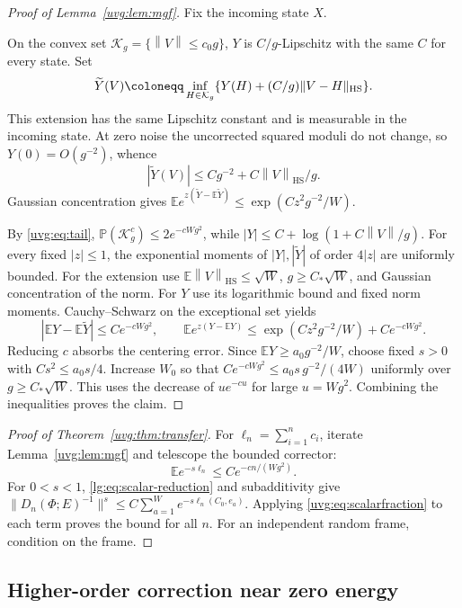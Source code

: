 \documentclass[11pt]{article}
\numberwithin{equation}{section}
\theoremstyle{remark}
\newcommand{\E}{\mathbb E}
\newcommand{\Prob}{\mathbb P}
\newcommand{\HS}{\mathrm{HS}}
\newcommand{\norm}[1]{\left\|#1\right\|}
\begin{document}
\begin{proof}[Proof of Lemma~\ref{uvg:lem:mgf}]
Fix the incoming state $X$.

On the convex set \(\mathcal K_g=\{\norm V\le c_0g\}\),
\(Y\) is \(C/g\)-Lipschitz with the same \(C\) for every state. Set
\[
 \widetilde Y(V)\coloneqq
 \inf_{H\in\mathcal K_g}\{Y(H)+(C/g)\|V-H\|_{\rm HS}\}.
\]
This extension has the same Lipschitz constant and is measurable in
the incoming state.
At zero noise the uncorrected squared moduli do not change,
so \(Y(0)=O(g^{-2})\), whence
\[
 |\widetilde Y(V)|\le Cg^{-2}+C\norm V_{\HS}/g.
\]
Gaussian concentration gives
\(\E e^{z(\widetilde Y-\E\widetilde Y)}
\le\exp(Cz^2g^{-2}/W)\).

By \eqref{uvg:eq:tail},
\(\Prob(\mathcal K_g^c)\le2e^{-cWg^2}\), while
\(|Y|\le C+\log(1+C\norm V/g)\).
For every fixed \(|z|\le1\), the exponential moments of
\(|Y|,|\widetilde Y|\) of order \(4|z|\) are uniformly bounded.
For the extension use \(\E\norm V_{\HS}\le\sqrt W\),
\(g\ge C_*\sqrt W\), and Gaussian concentration of the norm.
For \(Y\) use its logarithmic bound and fixed norm moments.
Cauchy--Schwarz on the exceptional set yields
\[
 |\E Y-\E\widetilde Y|\le Ce^{-cWg^2},\qquad
 \E e^{z(Y-\E Y)}
 \le\exp(Cz^2g^{-2}/W)+Ce^{-cWg^2}.
\]
Reducing \(c\) absorbs the centering error. Since
\(\E Y\ge a_0g^{-2}/W\), choose fixed \(s>0\) with
\(Cs^2\le a_0s/4\). Increase \(W_0\) so that
\(Ce^{-cWg^2}\le a_0s\,g^{-2}/(4W)\) uniformly over
\(g\ge C_*\sqrt W\). This uses the decrease of \(u e^{-cu}\)
for large \(u=Wg^2\). Combining the inequalities proves the claim.
\end{proof}

\begin{proof}[Proof of Theorem~\ref{uvg:thm:transfer}]
For \(\ell_n=\sum_{i=1}^n c_i\), iterate
Lemma~\ref{uvg:lem:mgf} and telescope the bounded corrector:
\begin{equation}\label{uvg:eq:scalarfraction}
 \E e^{-s\ell_n}\le Ce^{-cn/(Wg^2)}.
\end{equation}
For $0<s<1$, \eqref{lg:eq:scalar-reduction} and subadditivity give
$\|D_n(\Phi;E)^{-1}\|^s\le C\sum_{a=1}^W e^{-s\ell_n(C_0,e_a)}$.
Applying \eqref{uvg:eq:scalarfraction} to each term proves the bound
for all $n$. For an independent random frame, condition on the frame.

\end{proof}

\subsection{Higher-order correction near zero energy}
\label{lg:sec:drift-to-growth}
\end{document}
